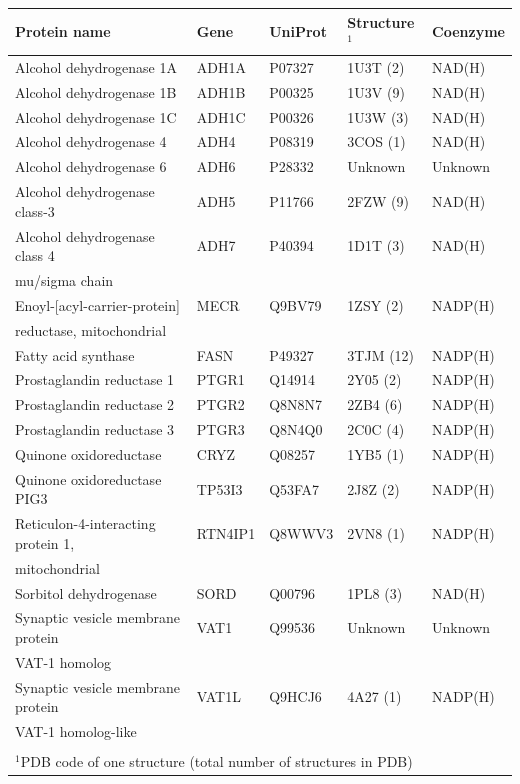\documentclass[a4paper, twoside, 12pt, openright]{report}
\begin{document}
\begin{table}[htb]
\begin{center}
{\begin{tabular}{lllll}
\toprule
Protein name & Gene & UniProt & Structure$^1$ & Coenzyme\\
\midrule
Alcohol dehydrogenase 1A & ADH1A & P07327 & 1U3T (2) & NAD(H)\\
Alcohol dehydrogenase 1B & ADH1B & P00325 & 1U3V (9) & NAD(H)\\
Alcohol dehydrogenase 1C & ADH1C & P00326 & 1U3W (3) & NAD(H)\\
Alcohol dehydrogenase 4 & ADH4 & P08319 & 3COS (1) & NAD(H)\\
Alcohol dehydrogenase 6 & ADH6 & P28332 & Unknown & Unknown\\
Alcohol dehydrogenase class-3 & ADH5 & P11766 & 2FZW (9) & NAD(H)\\
Alcohol dehydrogenase class 4 & ADH7 & P40394 & 1D1T (3) & NAD(H)\\
mu/sigma chain\\
Enoyl-[acyl-carrier-protein] & MECR & Q9BV79 & 1ZSY (2) & NADP(H)\\
reductase, mitochondrial\\
Fatty acid synthase & FASN & P49327 & 3TJM (12) & NADP(H)\\
Prostaglandin reductase 1 & PTGR1 & Q14914 & 2Y05 (2) & NADP(H)\\
Prostaglandin reductase 2 & PTGR2 & Q8N8N7 & 2ZB4 (6) & NADP(H)\\
Prostaglandin reductase 3 & PTGR3 & Q8N4Q0 & 2C0C (4) & NADP(H)\\
Quinone oxidoreductase & CRYZ & Q08257 & 1YB5 (1) & NADP(H)\\
Quinone oxidoreductase PIG3 & TP53I3 & Q53FA7 & 2J8Z (2) & NADP(H)\\
Reticulon-4-interacting protein 1, & RTN4IP1 & Q8WWV3 & 2VN8 (1) & NADP(H)\\
mitochondrial\\
Sorbitol dehydrogenase & SORD & Q00796 & 1PL8 (3) & NAD(H)\\
Synaptic vesicle membrane protein & VAT1 & Q99536 & Unknown & Unknown\\
VAT-1 homolog\\
Synaptic vesicle membrane protein & VAT1L & Q9HCJ6 & 4A27 (1) & NADP(H)\\
VAT-1 homolog-like\\
\bottomrule
\\[-10pt]
\multicolumn{5}{l}{$^1$PDB code of one structure (total number of structures in PDB)}
\end{tabular}}
\end{center}
\end{table}
\end{document}
